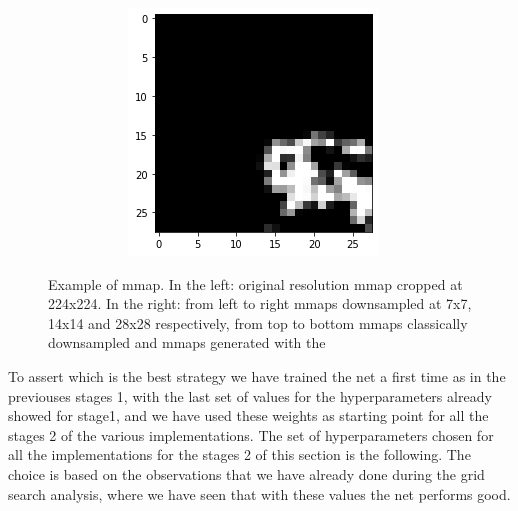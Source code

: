 \documentclass[10pt,twocolumn,hidelinks,letterpaper]{article}
\begin{document}
\begin{figure}[t]
\begin{subfigure}{.57\linewidth}
\begin{subfigure}{.32\linewidth}
  	\end{subfigure}
  	\begin{subfigure}{.32\linewidth}
  		\includegraphics[width=\linewidth]{images/mmaps_example/downsampling28x28_gray.png}
  	\end{subfigure}
  \end{subfigure}

	\caption{Example of mmap. In the left: original resolution mmap cropped at 224x224. In the right: from left to right mmaps downsampled at 7x7, 14x14 and 28x28 respectively, from top to bottom mmaps classically downsampled and mmaps generated with the }
	\label{mmaps}
\end{figure}

To assert which is the best strategy we have trained the net a first time as in the previouses stages 1, with the last set of values for the hyperparameters already showed for stage1, and we have used these weights as starting point for all the stages 2 of the various implementations. The set of hyperparameters chosen for all the implementations for the stages 2 of this section is the following. The choice is based on the observations that we have already done during the grid search analysis, where we have seen that with these values the net performs good.
\end{document}
